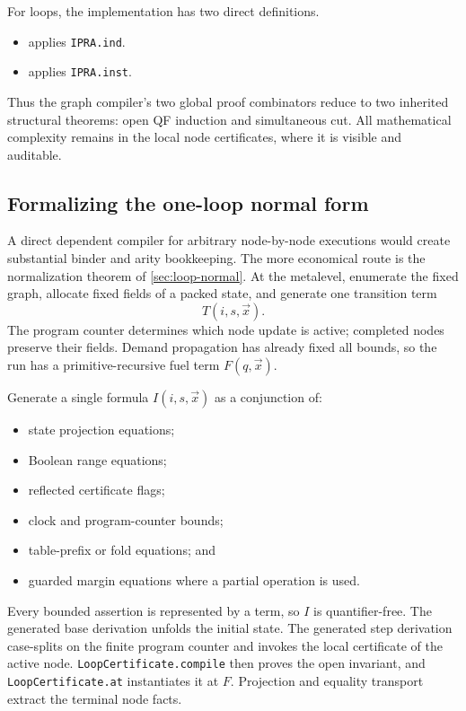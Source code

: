 For loops, the implementation has two direct definitions.
\begin{itemize}
\item {} applies \texttt{IPRA.ind}.
\item {} applies \texttt{IPRA.inst}.
\end{itemize}
Thus the graph compiler's two global proof combinators reduce to two inherited structural theorems: open QF induction and simultaneous cut.  All mathematical complexity remains in the local node certificates, where it is visible and auditable.

\subsection{Formalizing the one-loop normal form}

A direct dependent compiler for arbitrary node-by-node executions would create substantial binder and arity bookkeeping.  The more economical route is the normalization theorem of \cref{sec:loop-normal}.  At the metalevel, enumerate the fixed graph, allocate fixed fields of a packed state, and generate one transition term
\[
  T(i,s,\vec x).
\]
The program counter determines which node update is active; completed nodes preserve their fields.  Demand propagation has already fixed all bounds, so the run has a primitive-recursive fuel term \(F(q,\vec x)\).

Generate a single formula \(I(i,s,\vec x)\) as a conjunction of:
\begin{itemize}
\item state projection equations;
\item Boolean range equations;
\item reflected certificate flags;
\item clock and program-counter bounds;
\item table-prefix or fold equations; and
\item guarded margin equations where a partial operation is used.
\end{itemize}
Every bounded assertion is represented by a term, so \(I\) is quantifier-free.  The generated base derivation unfolds the initial state.  The generated step derivation case-splits on the finite program counter and invokes the local certificate of the active node.  \texttt{LoopCertificate.compile} then proves the open invariant, and \texttt{LoopCertificate.at} instantiates it at \(F\).  Projection and equality transport extract the terminal node facts.

